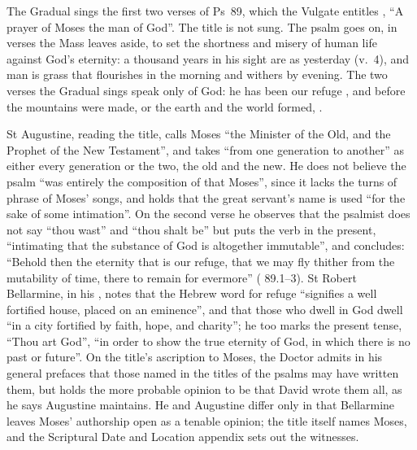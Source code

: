 The Gradual sings the first two verses of Ps~89, which the Vulgate entitles
, ``A prayer of Moses the man of God''. The
title is not sung. The psalm goes on, in verses the Mass leaves aside, to set
the shortness and misery of human life against God's eternity: a thousand
years in his sight are as yesterday (v.~4), and man is grass that flourishes in
the morning and withers by evening. The two verses the Gradual sings speak only
of God: he has been our refuge , and before the
mountains were made, or the earth and the world formed, .

St Augustine, reading the title, calls Moses ``the Minister of the Old, and the
Prophet of the New Testament'', and takes ``from one generation to another'' as
either every generation or the two, the old and the new. He does not believe the
psalm ``was entirely the composition of that Moses'', since it lacks the turns
of phrase of Moses' songs, and holds that the great servant's name is used ``for
the sake of some intimation''. On the second verse he observes that the psalmist
does not say ``thou wast'' and ``thou shalt be'' but puts the verb in the
present, ``intimating that the substance of God is altogether immutable'', and
concludes: ``Behold then the eternity that is our refuge, that we may fly thither
from the mutability of time, there to remain for evermore'' (
89.1--3). St Robert Bellarmine, in his , notes
that the Hebrew word for refuge ``signifies a well fortified house, placed on an
eminence'', and that those who dwell in God dwell ``in a city fortified by faith,
hope, and charity''; he too marks the present tense, ``Thou art God'', ``in order
to show the true eternity of God, in which there is no past or future''. On the
title's ascription to Moses, the Doctor admits in his general prefaces that
those named in the titles of the psalms may have written them, but holds the
more probable opinion to be that David wrote them all, as he says Augustine
maintains. He and Augustine differ only in that Bellarmine leaves Moses'
authorship open as a tenable opinion; the title itself names Moses, and the
Scriptural Date and Location appendix sets out the witnesses.

